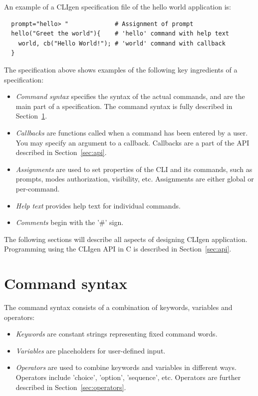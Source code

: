 \documentclass[a4paper, 10pt] {article}
\begin{document}
An example of a CLIgen specification file of the hello world application is:
\begin{verbatim}
  prompt="hello> "             # Assignment of prompt
  hello("Greet the world"){    # 'hello' command with help text
    world, cb("Hello World!"); # 'world' command with callback
  }
\end{verbatim}

The specification above shows examples of the following key ingredients of a specification:
\begin{itemize} 
\item
\emph{Command syntax} specifies the syntax of the actual commands, and
are the main part of a specification. The command syntax is fully
described in Section~\ref{sec:syntax}.
\item
\emph{Callbacks} are functions called when a command has been entered
by a user. You may specify an argument to a callback. Callbacks
are a part of the API described in Section~\ref{sec:api}.
\item
\emph{Assignments} are used to set properties of the CLI and its
commands, such as prompts, modes authorization, visibility,
etc. Assignments are either global or per-command.
\item
\emph{Help text} provides help text for individual commands.
\item
\emph{Comments} begin with the '\#' sign.
\end{itemize}

The following sections will describe all aspects of designing CLIgen
application. Programming using the CLIgen API in C is described in
Section~\ref{sec:api}.

\section{Command syntax}
\label{sec:syntax}

The command syntax consists of a combination of keywords, variables and
operators:
\begin{itemize}
\item
\emph{Keywords} are constant strings representing fixed command words.
\item
\emph{Variables} are placeholders for user-defined input.
\item
\emph{Operators} are used to combine keywords and variables in different ways. Operators
include 'choice', 'option', 'sequence', etc. Operators are further described in Section~\ref{sec:operators}.
\end{itemize}
\end{document}
